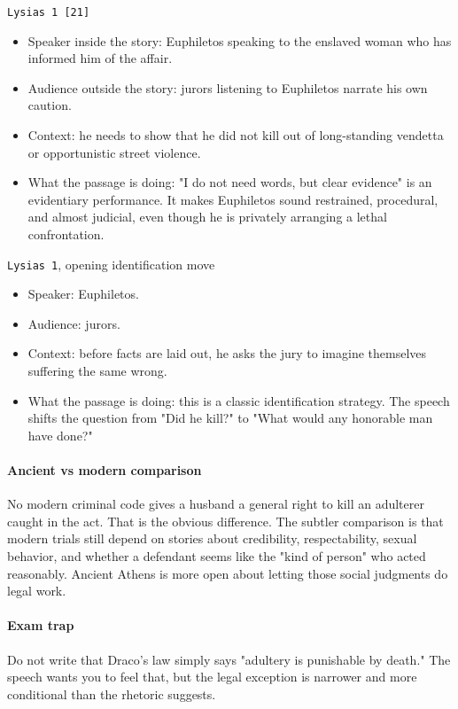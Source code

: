 \documentclass[11pt]{article}
\begin{document}
\texttt{Lysias 1 [21]}

\begin{itemize}
\item Speaker inside the story: Euphiletos speaking to the enslaved woman who has informed him of the affair.
\item Audience outside the story: jurors listening to Euphiletos narrate his own caution.
\item Context: he needs to show that he did not kill out of long-standing vendetta or opportunistic street violence.
\item What the passage is doing: "I do not need words, but clear evidence" is an evidentiary performance. It makes Euphiletos sound restrained, procedural, and almost judicial, even though he is privately arranging a lethal confrontation.
\end{itemize}

\texttt{Lysias 1}, opening identification move

\begin{itemize}
\item Speaker: Euphiletos.
\item Audience: jurors.
\item Context: before facts are laid out, he asks the jury to imagine themselves suffering the same wrong.
\item What the passage is doing: this is a classic identification strategy. The speech shifts the question from "Did he kill?" to "What would any honorable man have done?"
\end{itemize}

\paragraph{Ancient vs modern comparison}

No modern criminal code gives a husband a general right to kill an adulterer caught in the act. That is the obvious difference. The subtler comparison is that modern trials still depend on stories about credibility, respectability, sexual behavior, and whether a defendant seems like the "kind of person" who acted reasonably. Ancient Athens is more open about letting those social judgments do legal work.

\paragraph{Exam trap}

Do not write that Draco's law simply says "adultery is punishable by death." The speech wants you to feel that, but the legal exception is narrower and more conditional than the rhetoric suggests.
\end{document}
